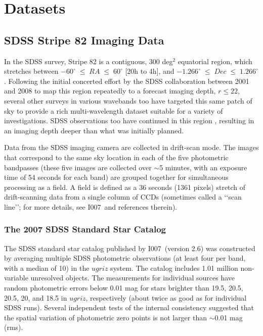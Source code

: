 \documentclass{aastex63}
\def\pO               {\hbox{I007}}
\begin{document}


\section{Datasets} \label{sec:data}

\subsection{SDSS Stripe 82 Imaging Data} \label{ssec:s82}

In the SDSS survey, Stripe 82 is a contiguous, 300 deg$^2$ equatorial region, which stretches between $-60^{\circ}\;\leq\;RA\;\leq\;60^{\circ}$ [20h to 4h], and $-1.266^{\circ}\;\leq\;Dec\;\leq\;1.266^{\circ}$. Following the initial concerted effort by the SDSS collaboration between 2001 and 2008 to map this region repeatedly to a forecast imaging depth, $r \leq 22$, several other surveys in various wavebands too have targeted this same patch of sky to provide a rich multi-wavelength dataset suitable for a variety of investigations. SDSS observations too have continued in this region \citep[e.g., the SDSS-II search for supernovae,][]{2008AJ....135..338F},
resulting in an imaging depth deeper than what was initially planned.  

Data from the SDSS imaging camera \citep{1998AJ....116.3040G} are collected in drift-scan mode. The images that correspond to the same sky location in each of the five photometric bandpasses (these five images are collected over $\sim$5 minutes, with an exposure time of 54 seconds for each band) are grouped together for simultaneous processing as a field. A field is defined as a 36 seconds (1361 pixels)  stretch of drift-scanning data from a single column of CCDs (sometimes called a ‘‘scan line’’; for more details, see \pO\ and references therein). 

\subsubsection{The 2007 SDSS Standard Star Catalog}

The SDSS standard star catalog published by \pO\ (version 2.6) was constructed by averaging multiple SDSS photometric observations (at least four per band, with a median of 10) in the $ugriz$ system. The catalog includes 1.01 million non-variable unresolved objects. The measurements for individual sources have random photometric errors below 0.01 mag for stars brighter than 19.5, 20.5, 20.5, 20, and 18.5 in $ugriz$, respectively (about twice as good as for individual SDSS runs). Several independent tests of the internal consistency suggested that the spatial variation of photometric zero points is not larger than $\sim$0.01 mag (rms).  
\end{document}
